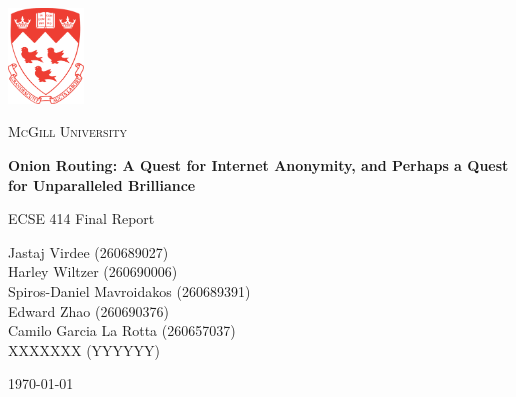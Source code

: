 \documentclass[10pt]{report}
\begin{document}
\begin{titlepage}
    \begin{center}
        \includegraphics[width=0.15\textwidth]{images/McGill.pdf}~\par\vspace{1cm}
        {\scshape\LARGE McGill University \par}
        \vspace{1cm}
        {\huge\bfseries Onion Routing: A Quest for Internet Anonymity, and Perhaps a Quest for Unparalleled Brilliance\par}
        \vspace{1.5cm}
        {\Large ECSE 414 Final Report\par}
        \vspace{2cm}
		{\Large Jastaj Virdee (260689027) \\}
		{\Large Harley Wiltzer (260690006) \\}
        {\Large Spiros-Daniel Mavroidakos (260689391) \\}
        {\Large Edward Zhao (260690376) \\}
        {\Large Camilo Garcia La Rotta (260657037) \\}
        {\Large XXXXXXX (YYYYYY) \\}
        \vfill
        {\large \today\par}
    \end{center}
\end{titlepage}

\tableofcontents
\doublespacing
\end{document}
